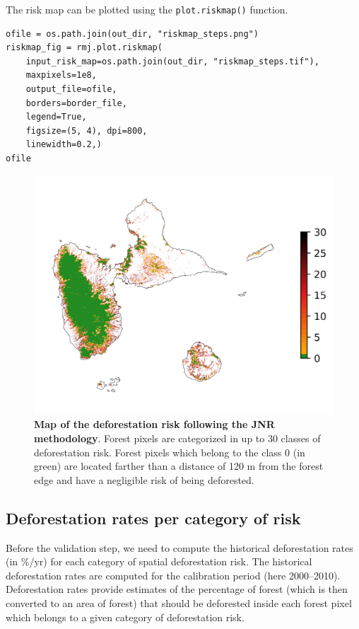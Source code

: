 \documentclass[paper=a4, 12pt, DIV=12]{scrartcl}
\begin{document}
The risk map can be plotted using the \texttt{plot.riskmap()} function.

\begin{verbatim}
ofile = os.path.join(out_dir, "riskmap_steps.png")
riskmap_fig = rmj.plot.riskmap(
    input_risk_map=os.path.join(out_dir, "riskmap_steps.tif"),
    maxpixels=1e8,
    output_file=ofile,
    borders=border_file,
    legend=True,
    figsize=(5, 4), dpi=800,
    linewidth=0.2,)
ofile
\end{verbatim}

\begin{figure}[H]
\centering
\includegraphics[width=0.8\linewidth]{outputs/riskmap_steps.png}
\caption{\label{fig:orged06871}\textbf{Map of the deforestation risk following the JNR methodology}. Forest pixels are categorized in up to 30 classes of deforestation risk. Forest pixels which belong to the class 0 (in green) are located farther than a distance of 120 m from the forest edge and have a negligible risk of being deforested.}
\end{figure}

\subsection{Deforestation rates per category of risk}
\label{sec:orgb91d16a}

Before the validation step, we need to compute the historical deforestation rates (in \%/yr) for each category of spatial deforestation risk. The historical deforestation rates are computed for the calibration period (here 2000--2010). Deforestation rates provide estimates of the percentage of forest (which is then converted to an area of forest) that should be deforested inside each forest pixel which belongs to a given category of deforestation risk.
\end{document}
